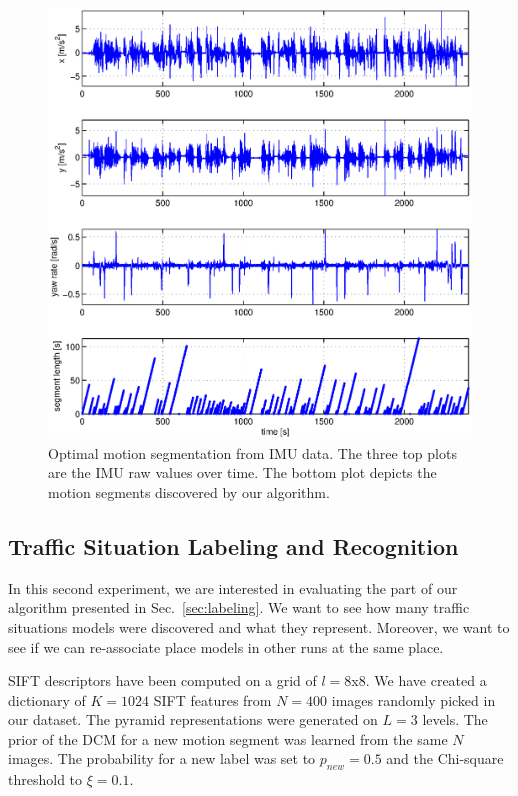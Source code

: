 \begin{figure}[t]
\centering
\includegraphics[width=\columnwidth]{fig/cpResult.eps}
\caption{Optimal motion segmentation from IMU data. The three top plots are the
IMU raw values over time. The bottom plot depicts the motion segments
discovered by our algorithm.}
\label{fig:motion_segments}
\end{figure}

\subsection{Traffic Situation Labeling and Recognition}
In this second experiment, we are interested in evaluating the part of our
algorithm presented in Sec.~\ref{sec:labeling}. We want to see how many traffic
situations models were discovered and what they represent. Moreover, we want
to see if we can re-associate place models in other runs at the same place.

SIFT descriptors have been computed on a grid of $l=8$x$8$. We have created a
dictionary of $K=1024$ SIFT features from $N=400$ images randomly picked in our
dataset. The pyramid representations were generated on $L=3$ levels. The prior
of the DCM for a new motion segment was learned from the same $N$ images. The
probability for a new label was set to $p_{new}=0.5$ and the Chi-square
threshold to $\xi=0.1$.

